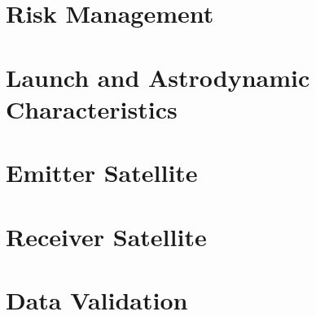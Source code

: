 \documentclass[11pt]{report}
\begin{document}
%
%

\chapter{Risk Management}
\label{chap:risk_management}


%
%
\chapter{Launch and Astrodynamic Characteristics}
\label{chap:astrodynamics}


%
%

\chapter{Emitter Satellite}
\label{chap:emitter}







%
%
	
\chapter{Receiver Satellite}
\label{chap:receiver}








%
%

\chapter{Data Validation}
\label{chap:sim}





%
%






%
%
\end{document}
